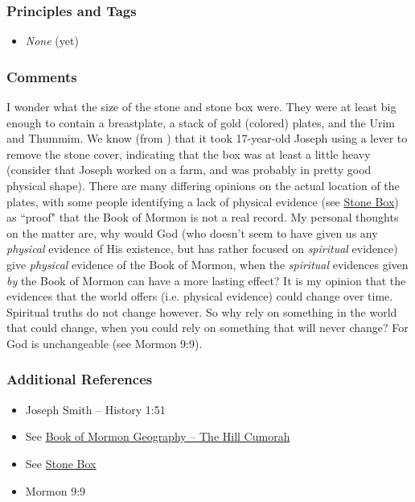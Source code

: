 \documentclass[12pt]{report}
\begin{document}
\subsubsection{Principles and Tags\label{js:principles18}}
\begin{itemize}
\item \index{}\emph{None} (yet)
\end{itemize}

\subsubsection{Comments\label{js:comments18}}
I wonder what the size of the stone and stone box were.  They were at least big enough to contain a breastplate, a stack of gold (colored) plates, and the Urim and Thummim.  We know (from ) that it took 17-year-old Joseph using a lever to remove the stone cover, indicating that the box was at least a little heavy (consider that Joseph worked on a farm, and was probably in pretty good physical shape).  There are many differing opinions on the actual location of the plates, with some people identifying a lack of physical evidence (see \href{http://www.mormonthink.com/glossary/stone-box.htm}{Stone Box}) as ``proof" that the Book of Mormon is not a real record.  My personal thoughts on the matter are, why would God (who doesn't seem to have given us any \emph{physical} evidence of His existence, but has rather focused on \emph{spiritual} evidence) give \emph{physical} evidence of the Book of Mormon, when the \emph{spiritual} evidences given \emph{by} the Book of Mormon can have a more lasting effect?  It is my opinion that the evidences that the world offers (i.e. physical evidence) could change over time.  Spiritual truths do not change however.  So why rely on something in the world that could change, when you could rely on something that will never change? For God is unchangeable (see Mormon 9:9).

\subsubsection{Additional References\label{js:references18}}
\begin{itemize}
\item Joseph Smith -- History 1:51
\item See \href{https://www.fairmormon.org/answers/Book_of_Mormon/Geography/New_World/Hill_Cumorah}{Book of Mormon Geography -- The Hill Cumorah}
\item See \href{http://www.mormonthink.com/glossary/stone-box.htm}{Stone Box}
\item Mormon 9:9
\end{itemize}
\end{document}
